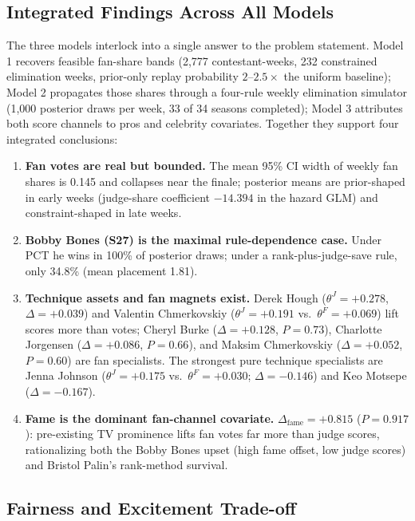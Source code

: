 \documentclass[11pt]{article}
\begin{document}
\subsection{Integrated Findings Across All Models}

The three models interlock into a single answer to the problem statement.
Model 1 recovers feasible fan-share bands (2,777 contestant-weeks, 232
constrained elimination weeks, prior-only replay probability $2$--$2.5\times$
the uniform baseline); Model 2 propagates those shares through a
four-rule weekly elimination simulator (1,000 posterior draws per week,
33 of 34 seasons completed); Model 3 attributes both score channels to
pros and celebrity covariates. Together they support four integrated
conclusions:

\begin{enumerate}
\item \textbf{Fan votes are real but bounded.} The mean 95\% CI width of
weekly fan shares is 0.145 and collapses near the finale; posterior means
are prior-shaped in early weeks (judge-share coefficient $-14.394$ in the
hazard GLM) and constraint-shaped in late weeks.
\item \textbf{Bobby Bones (S27) is the maximal rule-dependence case.}
Under PCT he wins in 100\% of posterior draws; under a rank-plus-judge-save
rule, only 34.8\% (mean placement 1.81).
\item \textbf{Technique assets and fan magnets exist.} Derek Hough
($\theta^J = +0.278$, $\Delta = +0.039$) and Valentin Chmerkovskiy
($\theta^J = +0.191$ vs.\ $\theta^F = +0.069$) lift scores more than
votes; Cheryl Burke ($\Delta = +0.128$, $P = 0.73$), Charlotte
Jorgensen ($\Delta = +0.086$, $P = 0.66$), and Maksim Chmerkovskiy
($\Delta = +0.052$, $P = 0.60$) are fan specialists. The strongest pure
technique specialists are Jenna Johnson ($\theta^J = +0.175$ vs.\
$\theta^F = +0.030$; $\Delta = -0.146$) and Keo Motsepe
($\Delta = -0.167$).
\item \textbf{Fame is the dominant fan-channel covariate.}
$\Delta_{\text{fame}} = +0.815$ ($P = 0.917$): pre-existing TV prominence
lifts fan votes far more than judge scores, rationalizing both the Bobby
Bones upset (high fame offset, low judge scores) and Bristol Palin's
rank-method survival.
\end{enumerate}

\subsection{Fairness and Excitement Trade-off}
\end{document}
